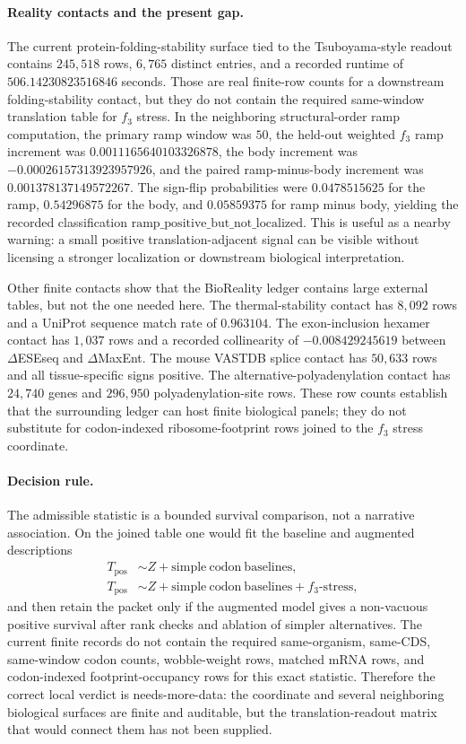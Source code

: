 \paragraph{Reality contacts and the present gap.}
The current protein-folding-stability surface tied to the Tsuboyama-style readout contains $245{,}518$ rows, $6{,}765$ distinct entries, and a recorded runtime of $506.14230823516846$ seconds.  Those are real finite-row counts for a downstream folding-stability contact, but they do not contain the required same-window translation table for $f_3$ stress.  In the neighboring structural-order ramp computation, the primary ramp window was $50$, the held-out weighted $f_3$ ramp increment was $0.0011165640103326878$, the body increment was $-0.00026157313923957926$, and the paired ramp-minus-body increment was $0.001378137149572267$.  The sign-flip probabilities were $0.0478515625$ for the ramp, $0.54296875$ for the body, and $0.05859375$ for ramp minus body, yielding the recorded classification $\mathrm{ramp\_positive\_but\_not\_localized}$.  This is useful as a nearby warning: a small positive translation-adjacent signal can be visible without licensing a stronger localization or downstream biological interpretation.

Other finite contacts show that the BioReality ledger contains large external tables, but not the one needed here.  The thermal-stability contact has $8{,}092$ rows and a UniProt sequence match rate of $0.963104$.  The exon-inclusion hexamer contact has $1{,}037$ rows and a recorded collinearity of $-0.008429245619$ between $\Delta$ESEseq and $\Delta$MaxEnt.  The mouse VASTDB splice contact has $50{,}633$ rows and all tissue-specific signs positive.  The alternative-polyadenylation contact has $24{,}740$ genes and $296{,}950$ polyadenylation-site rows.  These row counts establish that the surrounding ledger can host finite biological panels; they do not substitute for codon-indexed ribosome-footprint rows joined to the $f_3$ stress coordinate.

\paragraph{Decision rule.}
The admissible statistic is a bounded survival comparison, not a narrative association.  On the joined table one would fit the baseline and augmented descriptions
$$
\begin{aligned}
T_{\mathrm{pos}}&\sim Z+\mathrm{simple\ codon\ baselines},\\
T_{\mathrm{pos}}&\sim Z+\mathrm{simple\ codon\ baselines}+f_3\text{-}\mathrm{stress},
\end{aligned}
$$
and then retain the packet only if the augmented model gives a non-vacuous positive survival after rank checks and ablation of simpler alternatives.  The current finite records do not contain the required same-organism, same-CDS, same-window codon counts, wobble-weight rows, matched mRNA rows, and codon-indexed footprint-occupancy rows for this exact statistic.  Therefore the correct local verdict is needs-more-data: the coordinate and several neighboring biological surfaces are finite and auditable, but the translation-readout matrix that would connect them has not been supplied.

